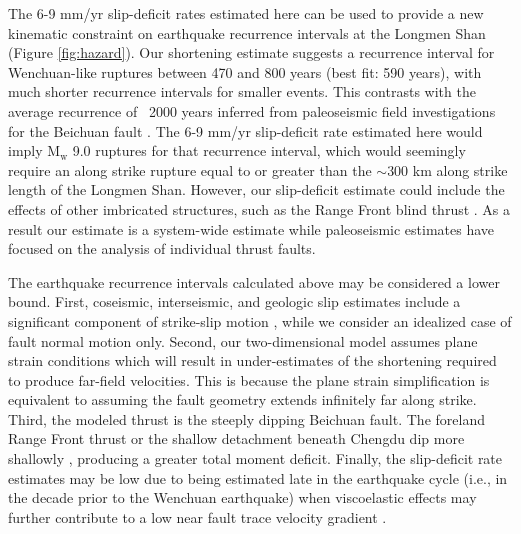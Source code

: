 \documentclass[draft,jgrga]{agutex}
\begin{document}
\begin{article}
The 6-9 mm/yr slip-deficit rates estimated here can be used to provide a new kinematic constraint on earthquake recurrence intervals at the Longmen Shan (Figure \ref{fig:hazard}). Our shortening estimate suggests a recurrence interval for Wenchuan-like ruptures between 470 and 800 years (best fit: 590 years), with much shorter recurrence intervals for smaller events. This contrasts with the average recurrence of ~2000 years inferred from paleoseismic field investigations for the Beichuan fault \citep{Ran2010}. The 6-9 mm/yr slip-deficit rate estimated here would imply $\textrm{M}_{\textrm{w}}$ 9.0 ruptures for that recurrence interval, which would seemingly require an along strike rupture equal to or greater than the ${\sim}300$ km along strike length of the Longmen Shan. However, our slip-deficit estimate could include the effects of other imbricated structures, such as the Range Front blind thrust \citep{Hubbard2010, Wang2014}. As a result our estimate is a system-wide estimate while paleoseismic estimates have focused on the analysis of individual thrust faults. 

The earthquake recurrence intervals calculated above may be considered a lower bound. First, coseismic, interseismic, and geologic slip estimates include a significant component of strike-slip motion \citep{Shen2009a, Qi2011, Densmore2007, Meade2007, Loveless2011}, while we consider an idealized case of fault normal motion only. Second, our two-dimensional model assumes plane strain conditions which will result in under-estimates of the shortening required to produce far-field velocities. This is because the plane strain simplification is equivalent to assuming the fault geometry extends infinitely far along strike. Third, the modeled thrust is the steeply dipping Beichuan fault. The foreland Range Front thrust or the shallow detachment beneath Chengdu dip more shallowly \citep{Hubbard2010}, producing a greater total moment deficit. Finally, the slip-deficit rate estimates may be low due to being estimated late in the earthquake cycle (i.e., in the decade prior to the Wenchuan earthquake) when viscoelastic effects may further contribute to a low near fault trace velocity gradient \citep{savage00}.


\end{article}
\end{document}
